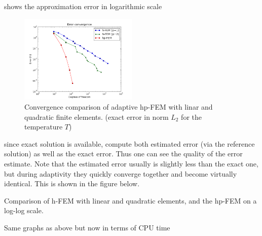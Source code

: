 shows the approximation error in logarithmic scale
\begin{figure}
  \includegraphics[width=0.5\textwidth]{figures/exact_err_conv}
  \caption{Convergence comparison of adaptive hp-FEM with linar and quadratic finite elements.  (exact error in norm $L_2$ for the temperature $T$)}
  \label{err_conv}
\end{figure}
since exact solution is available, compute both estimated error (via the reference solution) as well as the exact error.  Thus one can see the quality of the error estimate.  Note that the estimated error usually is slightly less than the exact one, but during adaptivity they quickly converge together and become virtually identical. This is shown in the figure below.

Comparison of h-FEM with linear and quadratic elements, and the hp-FEM on a log-log scale.

Same graphs as above but now in terms of CPU time

